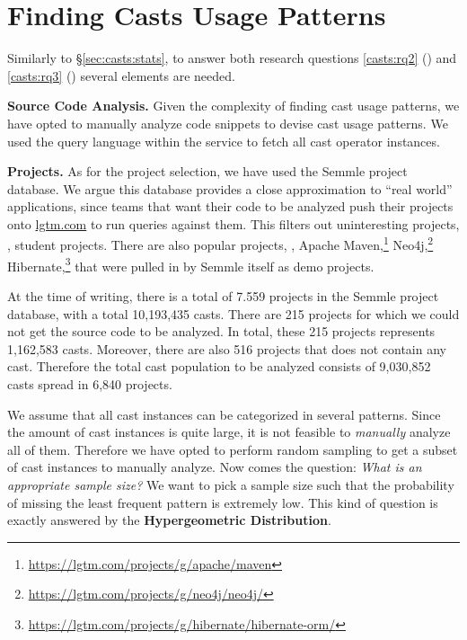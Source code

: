 \section{Finding Casts Usage Patterns}
\label{sec:casts:methodology}

Similarly to \S\ref{sec:casts:stats}, to answer both research questions
\ref{casts:rq2} (\emph{\crqB}) and \ref{casts:rq3} (\emph{\crqC}) several elements are needed.

\textbf{Source Code Analysis.}
Given the complexity of finding cast usage patterns, we have opted to manually analyze code snippets to devise cast usage patterns.
We used the \ql{} query language within the \lgtm{} service to fetch all cast operator instances.

\textbf{Projects.}
As for the project selection, we have used the Semmle project database.
We argue this database provides a close approximation to ``real world'' applications, since teams that want their code to be analyzed push their projects onto \href{https://lgtm.com}{lgtm.com} to run queries against them.
This filters out uninteresting projects, \eg, student projects.
There are also popular projects, \eg,
Apache Maven,\footnote{\url{https://lgtm.com/projects/g/apache/maven}}
Neo4j,\footnote{\url{https://lgtm.com/projects/g/neo4j/neo4j/}}
Hibernate,\footnote{\url{https://lgtm.com/projects/g/hibernate/hibernate-orm/}}
that were pulled in by Semmle itself as demo projects.


At the time of writing, there is a total of 7.559 projects in the Semmle project database, with a total 10,193,435 casts.
There are 215 projects for which we could not get the source code to be analyzed.
In total, these 215 projects represents 1,162,583 casts.
Moreover, there are also 516 projects that does not contain any cast.
Therefore the total cast population to be analyzed consists of 9,030,852 casts spread in 6,840 projects.

We assume that all cast instances can be categorized in several patterns.
Since the amount of cast instances is quite large, it is not feasible to \emph{manually} analyze all of them.
Therefore we have opted to perform random sampling to get a subset of cast instances to manually analyze.
Now comes the question: \emph{What is an appropriate sample size?}
We want to pick a sample size such that the probability of missing the least frequent pattern is extremely low.
This kind of question is exactly answered by the \textbf{Hypergeometric Distribution}.


